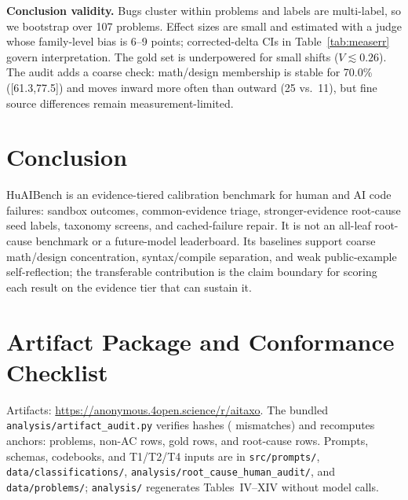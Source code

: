 \documentclass[conference]{IEEEtran}
\begin{document}
\textbf{Conclusion validity.} Bugs cluster within problems and labels are
multi-label, so we bootstrap over 107 problems. Effect sizes are small and estimated
with a judge whose family-level bias is 6--9 points; corrected-delta CIs in
Table~\ref{tab:measerr} govern interpretation. The gold set is underpowered for
small shifts ($V\!\lesssim\!0.26$). The audit adds a coarse check: math/design
membership is stable for 70.0\% ([61.3,77.5]) and moves inward more often than
outward (25 vs.\ 11), but fine source differences remain measurement-limited.

\section{Conclusion}
\label{sec:conclusion}
HuAIBench is an evidence-tiered calibration benchmark for human and AI code failures:
sandbox outcomes, common-evidence triage, stronger-evidence root-cause seed labels,
taxonomy screens, and cached-failure repair. It is not an all-leaf root-cause
benchmark or a future-model leaderboard. Its baselines support coarse math/design
concentration, syntax/compile separation, and weak public-example self-reflection;
the transferable contribution is the claim boundary for scoring each result on the
evidence tier that can sustain it.

\section{Artifact Package and Conformance Checklist}
\label{sec:artifacts}

\begingroup\raggedright\scriptsize
Artifacts: \url{https://anonymous.4open.science/r/aitaxo}. The bundled
\texttt{analysis/artifact\_audit.py} verifies \ArtifactManifestFiles{} hashes
(\ArtifactManifestMismatches{} mismatches) and recomputes anchors:
\ArtifactProblems{} problems, \ArtifactFullRows{} non-AC rows, \ArtifactGoldRows{}
gold rows, and \ArtifactRootRows{} root-cause rows. Prompts, schemas, codebooks, and
T1/T2/T4 inputs are in \texttt{src/prompts/}, \texttt{data/classifications/},
\texttt{analysis/root\_cause\_human\_audit/}, and \texttt{data/problems/};
\texttt{analysis/} regenerates Tables~IV--XIV without model calls.
\par\endgroup



\end{document}

